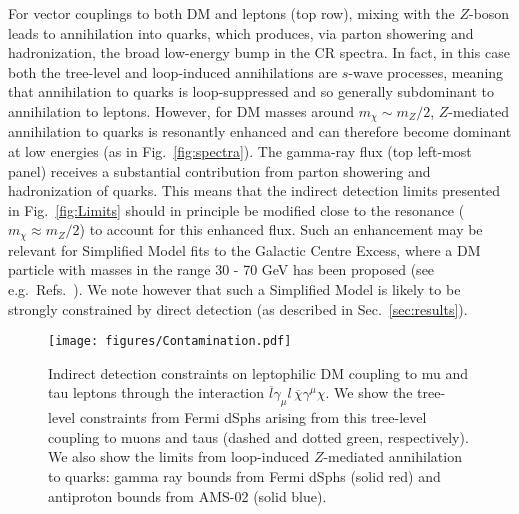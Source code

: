 \documentclass[final,5p,twocolumn]{elsarticle}
\begin{document}
For vector couplings to both DM and leptons (top row), mixing with the $Z$-boson leads to annihilation into quarks, which produces, via parton showering and hadronization, the broad low-energy bump in the CR spectra. In fact, in this case both the tree-level and loop-induced annihilations are $s$-wave processes, meaning that annihilation to quarks is loop-suppressed and so generally subdominant to annihilation to leptons. However, for DM masses around $m_\chi \sim m_Z/2$, $Z$-mediated annihilation to quarks is resonantly enhanced and can therefore become dominant at low energies (as in Fig.~\ref{fig:spectra}). The gamma-ray flux (top left-most panel) receives a substantial contribution from parton showering and hadronization of quarks. This means that the indirect detection limits presented in Fig.~\ref{fig:Limits} should in principle be modified close to the resonance ($m_\chi \approx m_Z/2$)  to account for this enhanced flux. Such an enhancement may be relevant for  Simplified Model fits to the Galactic Centre Excess, where a DM particle with masses in the range 30 - 70 GeV has been proposed (see e.g.~Refs.~\cite{Alves:2014yha,Abdullah:2014lla,Calore:2014nla}). We note however that such a Simplified Model is likely to be strongly constrained by direct detection (as described in Sec.~\ref{sec:results}).

\begin{figure}[t!]
\centering
{\texttt{[image: figures/Contamination.pdf]}}
\caption{Indirect detection constraints on leptophilic DM coupling to mu and tau leptons through the interaction $\overline{l}\gamma_\mu l \, \overline{\chi} \gamma^\mu \chi$. We show the tree-level constraints from Fermi dSphs arising from this tree-level coupling to muons and taus (dashed and dotted green, respectively). We also show the limits from loop-induced $Z$-mediated annihilation to quarks: gamma ray bounds from Fermi dSphs (solid red) and antiproton bounds from AMS-02 (solid blue).}
\label{fig:contamination}
\end{figure}
\end{document}
